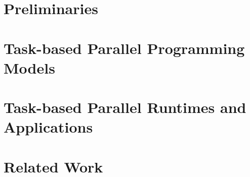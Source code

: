 \section{Preliminaries}
\label{sec:preliminaries}


\section{Task-based Parallel Programming Models}
\label{sec:taskbased_prog_models}


\section{Task-based Parallel Runtimes and Applications}
\label{sec:taskbased_runtimes_apps}


\section{Related Work}
\label{sec:relatedwork}


%
%        
